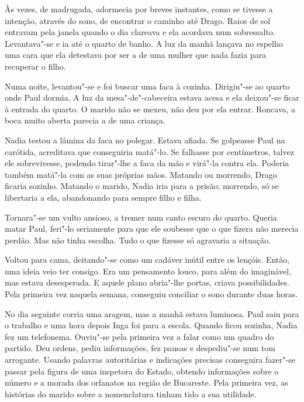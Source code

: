 Às vezes, de madrugada, adormecia por breves instantes, como se
tivesse a intenção, através do sono, de encontrar o caminho até Drago.
Raios de sol entravam pela janela quando o dia clareava e ela acordava
num sobressalto. Levantava"-se e ia até o quarto de banho. A luz da
manhã lançava no espelho uma cara que ela detestava por ser a de uma
mulher que nada fazia para recuperar o filho.

Numa noite, levantou"-se e
foi buscar uma faca à cozinha. Dirigiu"-se ao quarto onde Paul dormia.
A luz da mesa"-de"-cabeceira estava acesa e ela deixou"-se ficar à entrada
do quarto. O marido não se mexeu, não deu por ela entrar. Roncava, a
boca muito aberta parecia a de uma criança.

Nadia testou a lâmina da faca no polegar. Estava afiada. Se golpeasse
Paul na carótida, acreditava que conseguiria matá"-lo. Se falhasse por
centímetros, talvez ele sobrevivesse, podendo tirar"-lhe a faca da mão
e virá"-la contra ela. Poderia também matá"-la com as suas próprias mãos.
Matando ou morrendo, Drago ficaria sozinho. Matando o marido, Nadia iria
para a prisão; morrendo, só se libertaria a ela, abandonando para
sempre filho e filha.

Tornara"-se um vulto ansioso, a tremer num canto escuro do quarto. Queria
matar Paul, feri"-lo seriamente para que ele soubesse que o que fizera
não merecia perdão. Mas não tinha escolha. Tudo o que fizesse só
agravaria a situação.

Voltou para cama, deitando"-se como um cadáver inútil entre os lençóis.
Então, uma ideia veio ter consigo. Era um pensamento louco, para além do
imaginável, mas estava desesperada. E aquele plano abria"-lhe portas,
criava possibilidades. Pela primeira vez naquela semana, conseguiu conciliar o sono
durante duas horas.

\bigskip

No dia seguinte corria uma aragem, mas a manhã estava luminosa. Paul
saiu para o trabalho e uma hora depois Inga foi para a escola. Quando
ficou sozinha, Nadia fez um telefonema. Ouviu"-se pela primeira vez a
falar como um quadro do partido. Deu ordens, pediu informações, fez
pausas e despediu"-se num tom arrogante. Usando palavras autoritárias e
indicações precisas conseguira fazer"-se passar pela figura de uma
inspetora do Estado, obtendo informações sobre o número e a morada dos
orfanatos na região de Bucareste. Pela primeira vez, as histórias do
marido sobre a nomenclatura tinham tido a sua utilidade.

